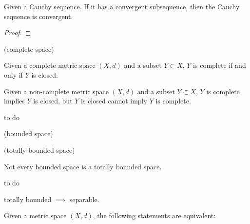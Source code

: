\begin{theorem}
Given a Cauchy sequence. If it has a convergent subsequence, then the Cauchy sequence is convergent. 
\end{theorem}

\begin{proof}
\end{proof}

\begin{definition}
(complete space)
\end{definition}

\begin{theorem}
Given a complete metric space $(X, d)$ and a subset $Y \subset X$, $Y$ is complete if and only if $Y$ is closed. 
\end{theorem}

\begin{warning}
Given a non-complete metric space $(X, d)$ and a subset $Y \subset X$, $Y$ is complete implies $Y$ is closed, but $Y$ is closed cannot imply $Y$ is complete. 
\end{warning}

\begin{example}
to do
\end{example}

\begin{definition}
\end{definition}

\begin{definition}
(bounded space)
\end{definition}

\begin{definition}
(totally bounded space)
\end{definition}

\begin{warning}
Not every bounded space is a totally bounded space. 
\end{warning}

\begin{example}
to do
\end{example}

\begin{theorem}
totally bounded $\implies$ separable. 
\end{theorem}

\begin{theorem}
Given a metric space $(X, d)$, the following statements are equivalent: 
\end{theorem}

